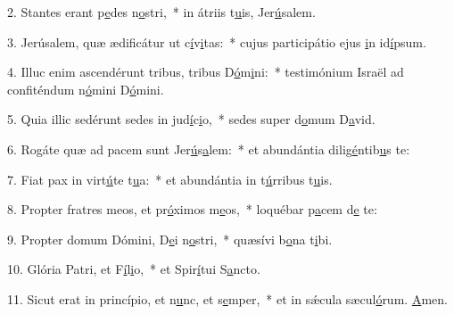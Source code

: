 2. Stantes erant p\uline{e}des n\uline{o}stri,~* in átriis t\uline{u}is, Jer\uline{ú}salem.\par 
3. Jerúsalem, quæ ædificátur ut c\uline{í}v\uline{i}tas:~* cujus participátio ejus \uline{i}n id\uline{í}psum.\par 
4. Illuc enim ascendérunt tribus, tribus D\uline{ó}m\uline{i}ni:~* testimónium Israël ad confiténdum n\uline{ó}mini D\uline{ó}mini.\par 
5. Quia illic sedérunt sedes in jud\uline{í}c\uline{i}o,~* sedes super d\uline{o}mum D\uline{a}vid.\par 
6. Rogáte quæ ad pacem sunt Jer\uline{ú}s\uline{a}lem:~* et abundántia dilig\uline{é}ntib\uline{u}s te:\par 
7. Fiat pax in virt\uline{ú}te t\uline{u}a:~* et abundántia in t\uline{ú}rribus t\uline{u}is.\par 
8. Propter fratres meos, et pr\uline{ó}ximos m\uline{e}os,~* loquébar p\uline{a}cem d\uline{e} te:\par 
9. Propter domum Dómini, D\uline{e}i n\uline{o}stri,~* quæsívi b\uline{o}na t\uline{i}bi.\par 
10. Glória Patri, et F\uline{í}l\uline{i}o,~* et Spir\uline{í}tui S\uline{a}ncto.\par 
11. Sicut erat in princípio, et n\uline{u}nc, et s\uline{e}mper,~* et in sǽcula sæcul\uline{ó}rum. \uline{A}men.\par 
